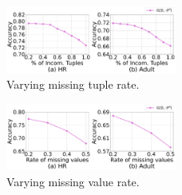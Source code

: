 
\begin{figure}
	\centering
	\includegraphics[width=0.5\textwidth]{figs/missingrate_all}
	\caption{Varying missing tuple rate.}
	\label{fig:vary_misstuple_all}
\end{figure}

\begin{figure}
	\centering
	\includegraphics[width=0.5\textwidth]{figs/missingrate_real}
	\caption{Varying missing value rate.}
	\label{fig:realmissrate}
\end{figure}




